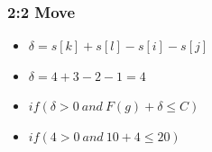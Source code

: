 \documentclass{beamer}
\begin{document}
\begin{frame}
\frametitle{2:2 Move}
\begin{footnotesize}
\begin{itemize}
\item $\delta = s[k]+s[l]-s[i]-s[j]$
\item $\delta = 4 + 3 - 2 - 1 = 4$
\item $if(\delta > 0 \ and \ F(g)+\delta \leq C)$
\item $if(4 > 0 \ and \ 10+4 \leq 20)$
\end{itemize}
\end{footnotesize}


\end{frame}
\end{document}
